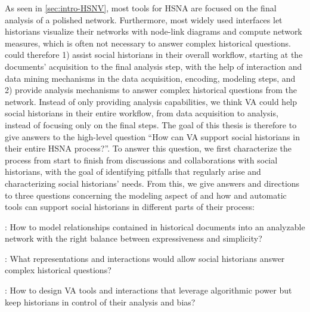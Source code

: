 As seen in \autoref{sec:intro-HSNV}, most \va tools for HSNA are focused on the final analysis of a polished network.
Furthermore, most widely used \snv interfaces let historians visualize their networks with node-link diagrams and compute network measures, which is often not necessary to answer complex historical questions.
\va could therefore 1) assist social historians in their overall workflow, starting at the documents' acquisition to the final analysis step, with the help of interaction and data mining mechanisms in the data acquisition, encoding, modeling steps, and 2) provide analysis mechanisms to answer complex historical questions from the network.
Instead of only providing analysis capabilities, we think VA could help social historians in their entire workflow, from data acquisition to analysis, instead of focusing only on the final steps.
The goal of this thesis is therefore to give answers to the high-level question ``How can VA support social historians in their entire HSNA process?''.
To answer this question, we first characterize the \hsna process from start to finish from discussions and collaborations with social historians, with the goal of identifying pitfalls that regularly arise and characterizing social historians' needs.
From this, we give answers and directions to three questions concerning the modeling aspect of \hsna and how \va and automatic tools can support social historians in different parts of their process:


\begin{description}
    \item \qone:  How to model relationships contained in historical documents into an analyzable network with the right balance between expressiveness and simplicity?
    \item \qtwo:  What representations and interactions would allow social historians answer complex historical questions?
    \item \qthree: How to design VA tools and interactions that leverage algorithmic power but keep historians in control of their analysis and bias?
\end{description}


